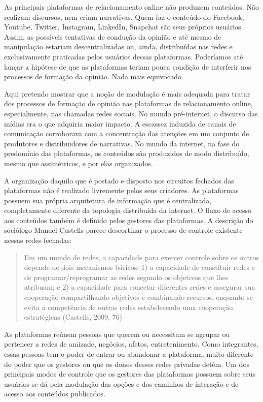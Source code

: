 As principais plataformas de relacionamento online não produzem
conteúdos. Não realizam discursos, nem criam narrativas. Quem faz o
conteúdo do Facebook, Youtube, Twitter, Instagram, LinkedIn, Snapchat
são seus próprios usuários. Assim, as possíveis tentativas de condução
da opinião e até mesmo de manipulação estariam descentralizadas ou,
ainda, distribuídas nas redes e exclusivamente praticadas pelos usuários
dessas plataformas. Poderíamos até lançar a hipótese de que as
plataformas teriam pouca condição de interferir nos processos de
formação da opinião. Nada mais equivocado.

Aqui pretendo mostrar que a noção de modulação é mais adequada para
tratar dos processos de formação de opinião nas plataformas de
relacionamento online, especialmente, nas chamadas redes sociais. No
mundo pré-internet, o discurso das mídias era o que adquiria maior
impacto. A escassez induzida de canais de comunicação corroborava com a
concentração das atenções em um conjunto de produtores e distribuidores
de narrativas. No mundo da internet, na fase do predomínio das
plataformas, os conteúdos são produzidos de modo distribuído, mesmo que
assimétricos, e por elas organizados.

A organização daquilo que é postado e disposto nos circuitos fechados
das plataformas não é realizado livremente pelos seus criadores. As
plataformas possuem sua própria arquitetura de informação que é
centralizada, completamente diferente da topologia distribuída da
internet. O fluxo de acesso aos conteúdos também é definido pelos
gestores das plataformas. A descrição do sociólogo Manuel Castells
parece descortinar o processo de controle existente nessas redes
fechadas:

\begin{quote}
Em um mundo de redes, a capacidade para exercer controle sobre os outros
depende de dois mecanismos básicos: 1) a capacidade de constituir redes
e de programar/reprogramar as redes segundo os objetivos que lhes
atribuam; e 2) a capacidade para conectar diferentes redes e assegurar
sua cooperação compartilhando objetivos e combinando recursos, enquanto
se evita a competência de outras redes estabelecendo uma cooperação
estratégicas (Castells, 2009, 76)
\end{quote}

As plataformas reúnem pessoas que querem ou necessitam se agrupar ou
pertencer a redes de amizade, negócios, afetos, entretenimento. Como
integrantes, essas pessoas tem o poder de entrar ou abandonar a
plataforma, muito diferente do poder que os gestores ou que os donos
desses redes privadas detém. Um dos principais modos de controle que os
gestores das plataformas possuem sobre seus usuários se dá pela
modulação das opções e dos caminhos de interação e de acesso aos
conteúdos publicados.

